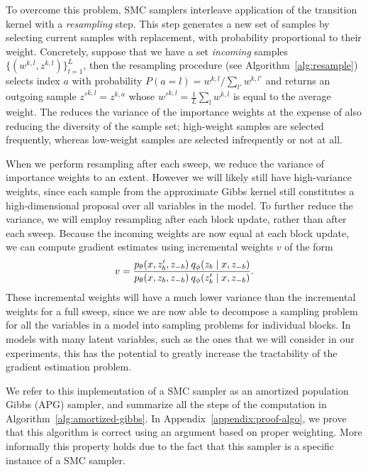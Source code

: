 \documentclass[anonymous=false, %
               format=acmsmall, %
               review=true, %
               screen=true, %
               nonacm=true]{acmart}
\theoremstyle{definition}
\begin{document}
To overcome this problem, SMC samplers interleave application of the transition kernel with a \emph{resampling} step. This step generates a new set of samples by selecting current samples with replacement, with probability proportional to their weight. Concretely, suppose that we have a set \emph{incoming} samples $\{(w^{k,l}, z^{k,l})\}_{l=1}^L$, then the resampling procedure (see Algorithm~\ref{alg:resample}) selects index $a$ with probability $P(a\!=\!l) = w^{k,l} / \sum_{l'} w^{k,l'}$ and returns an outgoing sample $z'^{k,l} = z^{k,a}$ whose $w'^{k,l} = \frac{1}{L} \sum_l w^{k,l}$ is equal to the average weight. The reduces the variance of the importance weights at the expense of also reducing the diversity of the sample set; high-weight samples are selected frequently, whereas low-weight samples are selected infrequently or not at all.

When we perform resampling after each sweep, we reduce the variance of importance weights to an extent. However we will likely still have high-variance weights, since each sample from the approximate Gibbs kernel still constitutes a high-dimensional proposal over all variables in the model. To further reduce the variance, we will employ resampling after each block update, rather than after each sweep. Because the incoming weights are now equal at each block update, we can compute gradient estimates using incremental weights $v$ of the form
\begin{align}
    v
    = 
    \frac{p_\theta(x, z'_b, z_{-b}) \: q_\phi(z_b \mid  x, z_{-b})}
         {p_\theta(x, z_b, z_{-b}) \: q_\phi(z'_b \mid  x, z_{-b})}
    .
\end{align}
These incremental weights will have a much lower variance than the incremental weights for a full sweep, since we are now able to decompose a sampling problem for all the variables in a model into sampling problems for individual blocks. In models with many latent variables, such as the ones that we will consider in our experiments, this has the potential to greatly increase the tractability of the gradient estimation problem. 


We refer to this implementation of a SMC sampler as an amortized population Gibbs (APG) sampler, and summarize all the steps of the computation in Algorithm~\ref{alg:amortized-gibbs}. In Appendix~\ref{appendix:proof-algo}, we prove that this algorithm is correct using an argument based on proper weighting. More informally this property holds due to the fact that this sampler is a specific instance of a SMC sampler. 
\end{document}
